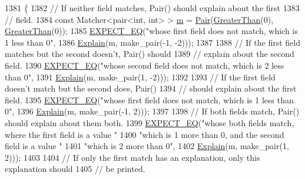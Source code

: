 \begin{DoxyCode}
1381                                         \{
1382   \textcolor{comment}{// If neither field matches, Pair() should explain about the first}
1383   \textcolor{comment}{// field.}
1384   \textcolor{keyword}{const} Matcher<pair<int, int> > \hyperlink{app_2main_8cpp_a0d2d8836216fc94b61aa0824eb239db2}{m} = \hyperlink{namespacetesting_ac7520de8af26d3085513eeeb68561889}{Pair}(\hyperlink{namespacetesting_1_1gmock__matchers__test_a8cf8614a7c9adc8fb00e8af04895f97c}{GreaterThan}(0), 
      \hyperlink{namespacetesting_1_1gmock__matchers__test_a8cf8614a7c9adc8fb00e8af04895f97c}{GreaterThan}(0));
1385   \hyperlink{gtest_8h_a4159019abda84f5366acdb7604ff220a}{EXPECT\_EQ}(\textcolor{stringliteral}{"whose first field does not match, which is 1 less than 0"},
1386             \hyperlink{namespacetesting_1_1gmock__matchers__test_a6215aeb6213a03f4233924ef1c74d968}{Explain}(m, make\_pair(-1, -2)));
1387 
1388   \textcolor{comment}{// If the first field matches but the second doesn't, Pair() should}
1389   \textcolor{comment}{// explain about the second field.}
1390   \hyperlink{gtest_8h_a4159019abda84f5366acdb7604ff220a}{EXPECT\_EQ}(\textcolor{stringliteral}{"whose second field does not match, which is 2 less than 0"},
1391             \hyperlink{namespacetesting_1_1gmock__matchers__test_a6215aeb6213a03f4233924ef1c74d968}{Explain}(m, make\_pair(1, -2)));
1392 
1393   \textcolor{comment}{// If the first field doesn't match but the second does, Pair()}
1394   \textcolor{comment}{// should explain about the first field.}
1395   \hyperlink{gtest_8h_a4159019abda84f5366acdb7604ff220a}{EXPECT\_EQ}(\textcolor{stringliteral}{"whose first field does not match, which is 1 less than 0"},
1396             \hyperlink{namespacetesting_1_1gmock__matchers__test_a6215aeb6213a03f4233924ef1c74d968}{Explain}(m, make\_pair(-1, 2)));
1397 
1398   \textcolor{comment}{// If both fields match, Pair() should explain about them both.}
1399   \hyperlink{gtest_8h_a4159019abda84f5366acdb7604ff220a}{EXPECT\_EQ}(\textcolor{stringliteral}{"whose both fields match, where the first field is a value "}
1400             \textcolor{stringliteral}{"which is 1 more than 0, and the second field is a value "}
1401             \textcolor{stringliteral}{"which is 2 more than 0"},
1402             \hyperlink{namespacetesting_1_1gmock__matchers__test_a6215aeb6213a03f4233924ef1c74d968}{Explain}(m, make\_pair(1, 2)));
1403 
1404   \textcolor{comment}{// If only the first match has an explanation, only this explanation should}
1405   \textcolor{comment}{// be printed.}

\end{DoxyCode}
